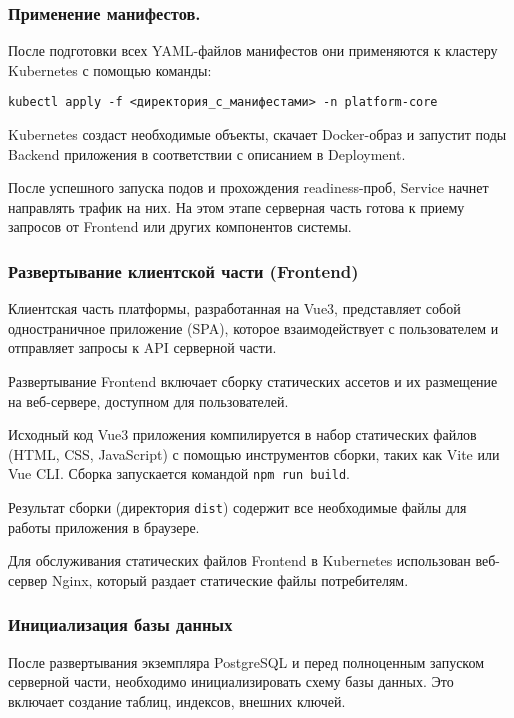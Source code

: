 \subsubsection{Применение манифестов.}

После подготовки всех YAML-файлов манифестов они применяются к кластеру Kubernetes с помощью команды:

\begin{verbatim}
kubectl apply -f <директория_с_манифестами> -n platform-core
\end{verbatim}

Kubernetes создаст необходимые объекты, скачает Docker-образ и запустит поды Backend приложения в соответствии с описанием в Deployment.

После успешного запуска подов и прохождения readiness-проб, Service начнет направлять трафик на них. На этом этапе серверная часть готова к приему запросов от Frontend или других компонентов системы. 

\subsubsection{Развертывание клиентской части (Frontend)}

Клиентская часть платформы, разработанная на Vue3, представляет собой одностраничное приложение (SPA), которое взаимодействует с пользователем и отправляет запросы к API серверной части. 

Развертывание Frontend включает сборку статических ассетов и их размещение на веб-сервере, доступном для пользователей.

Исходный код Vue3 приложения компилируется в набор статических файлов (HTML, CSS, JavaScript) с помощью инструментов сборки, таких как  Vite или Vue CLI. Сборка запускается командой \texttt{npm run build}.

Результат сборки (директория \texttt{dist}) содержит все необходимые файлы для работы приложения в браузере.

Для обслуживания статических файлов Frontend в Kubernetes использован веб-сервер Nginx, который раздает статические файлы потребителям.

\subsubsection{Инициализация базы данных}

После развертывания экземпляра PostgreSQL и перед полноценным запуском серверной части, необходимо инициализировать схему базы данных. Это включает создание таблиц, индексов, внешних ключей.

